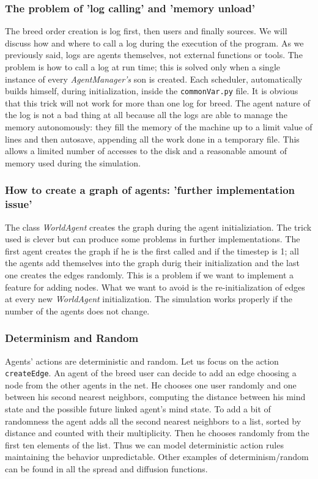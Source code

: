\subsubsection{The problem of 'log calling' and 'memory unload'}\label{subsubsec:logcalling}
The breed order creation is log first, then users and finally sources.
We will discuss how and where to call a log during the execution of the program.
As we previously said, logs are agents themselves, not external functions
or tools. The problem is how to call a log at run time; this is solved
only when a single instance of every \textit{AgentManager's} son is
created. Each scheduler, automatically builds himself, during
initialization, inside the \texttt{commonVar.py} file.
It is obvious that this trick will not work for more than one log for breed.
The agent nature of the log is not a bad thing at all because all the logs are
able to manage the memory autonomously: they fill the memory of the machine
up to a limit value of lines and then autosave, appending all the work done
in a temporary file. This allows a limited number of accesses to the disk and
a reasonable amount of memory used during the simulation.

\subsubsection{How to create a graph of agents:
  'further implementation issue'}\label{subsubsec:furtherissue}
The class \textit{WorldAgent} creates the graph during the agent
initializiation. The trick used is clever but can produce some
problems in further implementations. The first agent creates the graph
if he is the first called and if the timestep is 1; all the
agents add themselves into the graph durig their initialization
and the last one creates the edges randomly.
This is a problem if we want to implement a feature for adding nodes.
What we want to avoid is the re-initialization of edges at every new
\textit{WorldAgent} initialization. The simulation works properly if the
number of the agents does not change.

\subsubsection{Determinism and Random}\label{subsubsec:detran}
Agents' actions are deterministic and random.
Let us focus on the action \texttt{createEdge}.
An agent of the breed user can decide to add an edge choosing a node
from the other agents in the net.
He chooses one user randomly and one between his second nearest neighbors,
computing the distance between his mind state and the
possible future linked agent's mind state. To add a bit of randomness
the agent adds all the second nearest neighbors to a list,
sorted by distance and counted with their multiplicity.
Then he chooses randomly from the first ten
elements of the list. Thus we can model deterministic action rules
maintaining the behavior unpredictable.
Other examples of determinism/random can be found in all the spread
and diffusion functions. 

